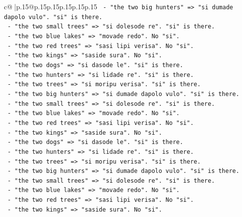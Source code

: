 \documentclass{article}
\begin{document}
{\begin{supertabular}{c@{$\;$}|p{.15\linewidth}@{}p{.15\linewidth}p{.15\linewidth}p{.15\linewidth}p{.15\linewidth}p{.15\linewidth}}
{{{\texttt{                 {-} "the two big hunters" => "si dumade dapolo vulo". "si" is there.} \\
\texttt{                 {-} "the two small trees" => "si dolesode re". "si" is there.} \\
\texttt{                 {-} "the two blue lakes" => "movade redo". No "si".} \\
\texttt{                 {-} "the two red trees" => "sasi lipi verisa". No "si".} \\
\texttt{                 {-} "the two kings" => "saside sura". No "si".} \\
\texttt{                 {-} "the two dogs" => "si dasode le". "si" is there.} \\
\texttt{                 {-} "the two hunters" => "si lidade re". "si" is there.} \\
\texttt{                 {-} "the two trees" => "si moripu verisa". "si" is there.} \\
\texttt{                 {-} "the two big hunters" => "si dumade dapolo vulo". "si" is there.} \\
\texttt{                 {-} "the two small trees" => "si dolesode re". "si" is there.} \\
\texttt{                 {-} "the two blue lakes" => "movade redo". No "si".} \\
\texttt{                 {-} "the two red trees" => "sasi lipi verisa". No "si".} \\
\texttt{                 {-} "the two kings" => "saside sura". No "si".} \\
\texttt{                 {-} "the two dogs" => "si dasode le". "si" is there.} \\
\texttt{                 {-} "the two hunters" => "si lidade re". "si" is there.} \\
\texttt{                 {-} "the two trees" => "si moripu verisa". "si" is there.} \\
\texttt{                 {-} "the two big hunters" => "si dumade dapolo vulo". "si" is there.} \\
\texttt{                 {-} "the two small trees" => "si dolesode re". "si" is there.} \\
\texttt{                 {-} "the two blue lakes" => "movade redo". No "si".} \\
\texttt{                 {-} "the two red trees" => "sasi lipi verisa". No "si".} \\
\texttt{                 {-} "the two kings" => "saside sura". No "si".} \\
}}}
\end{supertabular}}
\end{document}
